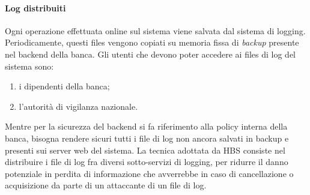 \paragraph{Log distribuiti}
Ogni operazione effettuata online sul sistema viene salvata dal sistema di logging.
Periodicamente, questi files vengono copiati su memoria fissa di \emph{backup} presente nel backend della banca.
Gli utenti che devono poter accedere ai files di log del sistema sono:
\begin{enumerate}
\item i dipendenti della banca;
\item l'autorità di vigilanza nazionale.
\end{enumerate}
Mentre per la sicurezza del backend si fa riferimento alla policy interna della banca, bisogna rendere sicuri tutti i file di log non ancora salvati in backup e presenti sui server web del sistema.
La tecnica adottata da HBS consiste nel distribuire i file di log fra diversi sotto-servizi di logging, per ridurre il danno potenziale in perdita di informazione che avverrebbe in caso di cancellazione o acquisizione da parte di un attaccante di un file di log.














